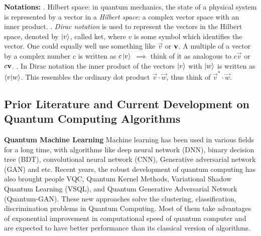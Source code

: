 \documentclass{article}
\begin{document}
\textbf{Notations: } . Hilbert space: in quantum mechanics, 
the state of a physical system is represented by a vector in 
a \textit{Hilbert space}: a complex vector space with an inner product. . \textit{Dirac notation} is used to represent the vectors in the 
Hilbert space, denoted by $\ket{v}$, called ket, where $v$ is 
some symbol which identifies the vector. One could equally well 
use something like $\overrightarrow{v}$ or $\text{\textbf{v}}$. A 
multiple of a vector by a complex number $c$ is written as 
$c\ket{v}$ $\implies$ think of it as analogous to $c \overrightarrow{v}$ 
or $c \text{\textbf{v}}$. . In Dirac notation the inner 
product of the vectors $\ket{v}$ with $\ket{w}$ is written as $\braket{v}{w}$. 
This resembles the ordinary dot product $\overrightarrow{v} \cdot \overrightarrow{w}$, 
thus think of $\overrightarrow{v}^{*} \cdot \overrightarrow{w}$.

\subsection{Prior Literature and Current Development on Quantum Computing Algorithms}

\textbf{Quantum Machine Learning} Machine learning has been used in various fields for a long time, 
with algorithms like deep neural network (DNN), binary decision tree (BDT),
convolutional neural network (CNN), Generative adversarial network (GAN) and 
etc. Recent years, 
the robust development of quantum computing has also brought people 
VQC, Quantum Kernel Methods, Variational Shadow Quantum Learning (VSQL), and Quantum Generative 
Adversarial Network (Quantum-GAN). These new approaches solve 
the clustering, classification, discrimination problems in 
Quantum Computing. Most of them take advantages of exponential 
improvement in computational speed of quantum computer and are expected 
to have better performance than its classical version of algorithms. 
\end{document}

